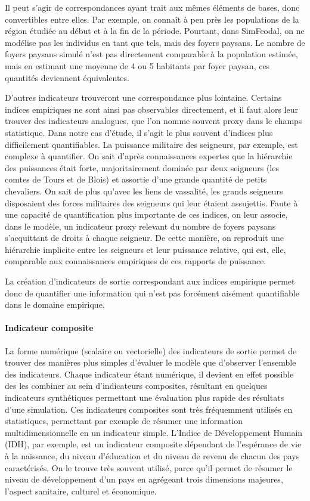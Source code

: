 Il peut s'agir de correspondances ayant trait aux mêmes éléments de bases, donc \og convertibles\fg{} entre elles. Par exemple, on connaît à peu près les populations de la région étudiée au début et à la fin de la période. Pourtant, dans SimFeodal, on ne modélise pas les individus en tant que tels, mais des foyers paysans. Le nombre de foyers paysans simulé n'est pas directement comparable à la population estimée, mais en estimant une moyenne de 4 ou 5 habitants par foyer paysan, ces quantités deviennent équivalentes.

D'autres indicateurs trouveront une correspondance plus lointaine. Certains indices empiriques ne sont ainsi pas observables directement, et il faut alors leur trouver des indicateurs analogues, que l'on nomme souvent \og proxy\fg{} dans le champs statistique. Dans notre cas d'étude, il s'agit le plus souvent d'indices plus difficilement quantifiables. La puissance militaire des seigneurs, par exemple, est complexe à quantifier. On sait d'après connaissances expertes que la hiérarchie des puissances était forte, majoritairement dominée par deux seigneurs (les comtes de Tours et de Blois) et assortie d'une grande quantité de petits chevaliers. On sait de plus qu'avec les liens de vassalité, les grands seigneurs disposaient des forces militaires des seigneurs qui leur étaient assujettis. Faute à une capacité de quantification plus importante de ces indices, on leur associe, dans le modèle, un indicateur proxy relevant du nombre de foyers paysans s'acquittant de droits à chaque seigneur. De cette manière, on reproduit une hiérarchie implicite entre les seigneurs et leur puissance relative, qui est, elle, comparable aux connaissances empiriques de ces rapports de puissance.

La création d'indicateurs de sortie correspondant aux indices empirique permet donc de quantifier une information qui n'est pas forcément aisément quantifiable dans le domaine empirique.

\paragraph{Indicateur composite}

La forme numérique (scalaire ou vectorielle) des indicateurs de sortie permet de trouver des manières plus simples d'évaluer le modèle que d'observer l'ensemble des indicateurs. Chaque indicateur étant numérique, il devient en effet possible des les combiner au sein d'indicateurs composites, résultant en quelques indicateurs synthétiques permettant une évaluation plus rapide des résultats d'une simulation.
Ces indicateurs composites sont très fréquemment utilisés en statistiques, permettant par exemple de résumer une information multidimensionnelle en un indicateur simple. L'Indice de Développement Humain (IDH), par exemple, est un indicateur composite dépendant de l'espérance de vie à la naissance, du niveau d'éducation et du niveau de revenu de chacun des pays caractérisés. On le trouve très souvent utilisé, parce qu'il permet de résumer le niveau de développement d'un pays en agrégeant trois dimensions majeures, l'aspect sanitaire, culturel et économique.

